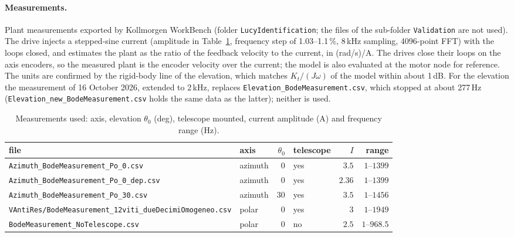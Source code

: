 \documentclass[10pt,a4paper]{article}
\numberwithin{equation}{section}
\begin{document}
\paragraph{Measurements.} Plant measurements exported by Kollmorgen WorkBench (folder \texttt{LucyIdentification}; the files of the sub-folder \texttt{Validation} are not used). The drive injects a stepped-sine current (amplitude in Table~\ref{tab:exp_meas}, frequency step of 1.03--1.1\,\%, 8\,kHz sampling, 4096-point FFT) with the loops closed, and estimates the plant as the ratio of the feedback velocity to the current, in (rad/s)/A. The drives close their loops on the axis encoders, so the measured plant is the encoder velocity over the current; the model is also evaluated at the motor node for reference. The units are confirmed by the rigid-body line of the elevation, which matches $K_t/(J\omega)$ of the model within about 1\,dB. For the elevation the measurement of 16 October 2026, extended to 2\,kHz, replaces \texttt{Elevation\_BodeMeasurement.csv}, which stopped at about 277\,Hz (\texttt{Elevation\_new\_BodeMeasurement.csv} holds the same data as the latter); neither is used.
\begin{table}[H]\centering\small
\caption{Measurements used: axis, elevation $\theta_0$ (deg), telescope mounted, current amplitude (A) and frequency range (Hz).}\label{tab:exp_meas}
\begin{tabular}{llrlrr}\toprule
file & axis & $\theta_0$ & telescope & $I$ & range \\ \midrule
\texttt{Azimuth\_BodeMeasurement\_Po\_0.csv} & azimuth & $0$ & yes & $3.5$ & $1$--$1399$ \\
\texttt{Azimuth\_BodeMeasurement\_Po\_0\_dep.csv} & azimuth & $0$ & yes & $2.36$ & $1$--$1399$ \\
\texttt{Azimuth\_BodeMeasurement\_Po\_30.csv} & azimuth & $30$ & yes & $3.5$ & $1$--$1456$ \\
\texttt{VAntiRes/BodeMeasurement\_12viti\_dueDecimiOmogeneo.csv} & polar & $0$ & yes & $3$ & $1$--$1949$ \\
\texttt{BodeMeasurement\_NoTelescope.csv} & polar & $0$ & no & $2.5$ & $1$--$968.5$ \\
\bottomrule\end{tabular}\end{table}
\end{document}
